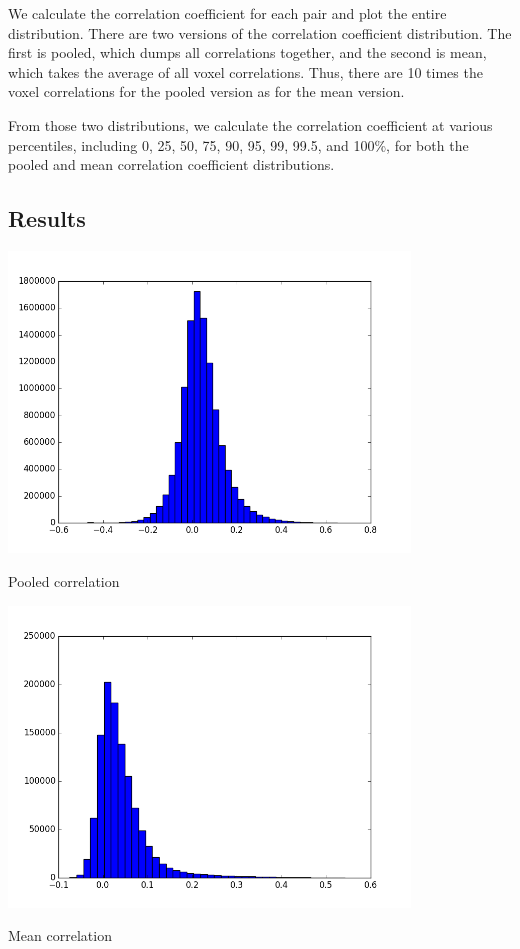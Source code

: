 We calculate the correlation coefficient for each pair and plot the entire
distribution.  There are two versions of the correlation coefficient 
distribution.  The first is pooled, which dumps all correlations together, 
and the second is mean, which takes the average of all voxel correlations.  
Thus, there are 10 times the voxel correlations for the pooled version as for 
the mean version.

From those two distributions, we calculate the correlation coefficient at
various percentiles, including 0, 25, 50, 75, 90, 95, 99, 99.5, and 100\%,
for both the pooled and mean correlation coefficient distributions.

\subsection{Results}

\begin{center}                                                                  
\includegraphics[height=8cm]{pooled_correlation_histogram} 
\end{center}  
Pooled correlation
\begin{center}                                                                  
\includegraphics[height=8cm]{mean_correlation_histogram} 
\end{center}  
Mean correlation

